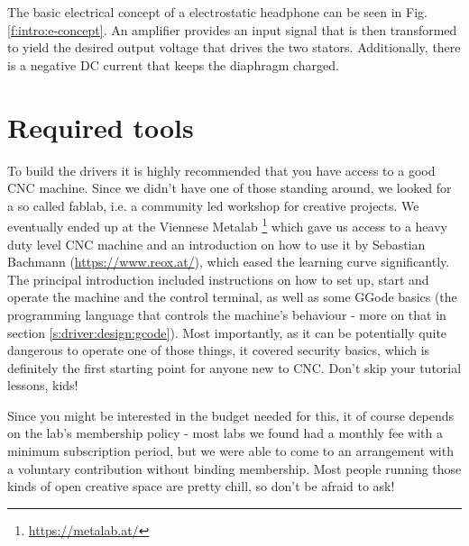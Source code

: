 \documentclass{article}
\begin{document}
The basic electrical concept of a electrostatic headphone can be seen in Fig. \ref{f:intro:e-concept}. An amplifier provides an input signal that is then transformed to yield the desired output voltage that drives the two stators. Additionally, there is a negative DC current that keeps the diaphragm charged.

\section{Required tools}
\label{s:tools}

To build the drivers it is highly recommended that you have access to a good CNC machine. Since we didn't have one of those standing around, we looked for a so called fablab, i.e. a community led workshop for creative projects. We eventually ended up at the Viennese Metalab \footnote{\url{https://metalab.at/}} which gave us access to a heavy duty level CNC machine and an introduction on how to use it by Sebastian Bachmann (\url{https://www.reox.at/}), which eased the learning curve significantly. The principal introduction included instructions on how to set up, start and operate the machine and the control terminal, as well as some GGode basics (the programming language that controls the machine's behaviour - more on that in section \ref{s:driver:design:gcode}). Most importantly, as it can be potentially quite dangerous to operate one of those things, it covered security basics, which is definitely the first starting point for anyone new to CNC. Don't skip your tutorial lessons, kids!

Since you might be interested in the budget needed for this, it of course depends on the lab's membership policy - most labs we found had a monthly fee with a minimum subscription period, but we were able to come to an arrangement with a voluntary contribution without binding membership. Most people running those kinds of open creative space are pretty chill, so don't be afraid to ask!
\end{document}
